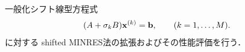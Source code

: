 

一般化シフト線型方程式
\begin{align}
	(A + \sigma_{k}B)\vb{x}^{(k)} = \vb{b}, \qquad (k=1,\dots,M).
	\label{eq-gsls}
\end{align}
に対する shifted MINRES法\cite{ref-SeitoH-2019}の拡張およびその性能評価を行う．

